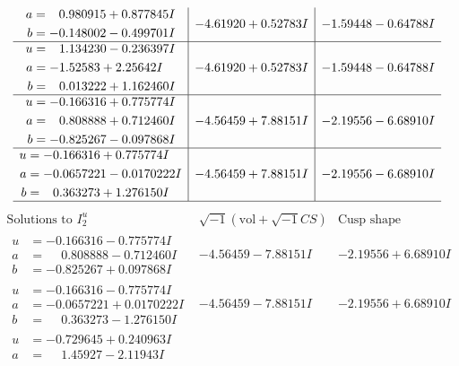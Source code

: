 \documentclass[1p]{elsarticle_modified}
\theoremstyle{definition}
\newcommand{\I}{\sqrt{-1}}
\begin{document}
$$\begin{array}{c|c|c}
\begin{aligned}
a &= \phantom{-}0.980915 + 0.877845 I \\
b &= -0.148002 - 0.499701 I\end{aligned}
 & -4.61920 + 0.52783 I & -1.59448 - 0.64788 I \\ \hline\begin{aligned}
u &= \phantom{-}1.134230 - 0.236397 I \\
a &= -1.52583 + 2.25642 I \\
b &= \phantom{-}0.013222 + 1.162460 I\end{aligned}
 & -4.61920 + 0.52783 I & -1.59448 - 0.64788 I \\ \hline\begin{aligned}
u &= -0.166316 + 0.775774 I \\
a &= \phantom{-}0.808888 + 0.712460 I \\
b &= -0.825267 - 0.097868 I\end{aligned}
 & -4.56459 + 7.88151 I & -2.19556 - 6.68910 I \\ \hline\begin{aligned}
u &= -0.166316 + 0.775774 I \\
a &= -0.0657221 - 0.0170222 I \\
b &= \phantom{-}0.363273 + 1.276150 I\end{aligned}
 & -4.56459 + 7.88151 I & -2.19556 - 6.68910 I\\
 \hline 
 \end{array}$$\newpage$$\begin{array}{c|c|c}  
\text{Solutions to }I^u_{2}& \I (\text{vol} + \sqrt{-1}CS) & \text{Cusp shape}\\
 \hline 
\begin{aligned}
u &= -0.166316 - 0.775774 I \\
a &= \phantom{-}0.808888 - 0.712460 I \\
b &= -0.825267 + 0.097868 I\end{aligned}
 & -4.56459 - 7.88151 I & -2.19556 + 6.68910 I \\ \hline\begin{aligned}
u &= -0.166316 - 0.775774 I \\
a &= -0.0657221 + 0.0170222 I \\
b &= \phantom{-}0.363273 - 1.276150 I\end{aligned}
 & -4.56459 - 7.88151 I & -2.19556 + 6.68910 I \\ \hline\begin{aligned}
u &= -0.729645 + 0.240963 I \\
a &= \phantom{-}1.45927 - 2.11943 I \\

\end{aligned}
\end{array}$$
\end{document}
